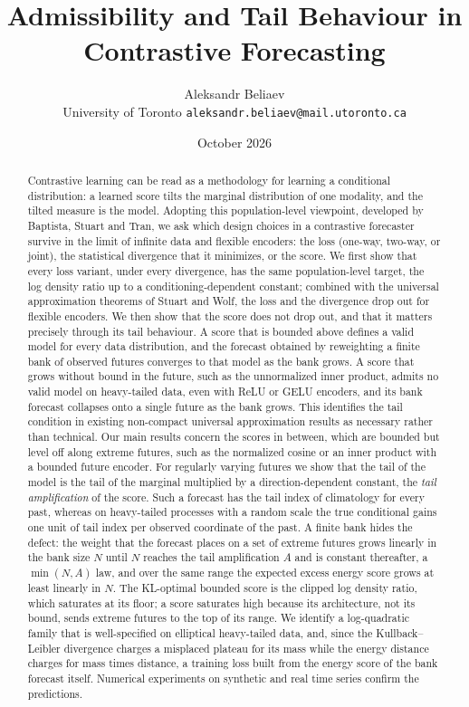 \documentclass[11pt]{article}
\title{Admissibility and Tail Behaviour in Contrastive Forecasting}
\author{Aleksandr Beliaev\\ \small University of Toronto \quad \texttt{aleksandr.beliaev@mail.utoronto.ca}}
\date{October 2026}
\theoremstyle{plain}
\theoremstyle{definition}
\theoremstyle{remark}
\begin{document}
\maketitle

\begin{abstract}
 Contrastive learning can be read as a methodology for learning a conditional
 distribution: a learned score tilts the marginal distribution of one modality,
 and the tilted measure is the model. Adopting this population-level viewpoint,
 developed by Baptista, Stuart and Tran, we ask which design choices in a
 contrastive forecaster survive in the limit of infinite data and flexible
 encoders: the loss (one-way, two-way, or joint), the statistical divergence
 that it minimizes, or the score. We first show that every loss variant, under
 every divergence, has the same population-level target, the log density ratio
 up to a conditioning-dependent constant; combined with the universal
 approximation theorems of Stuart and Wolf, the loss and the divergence drop
 out for flexible encoders. We then show that the score does not drop out, and
 that it matters precisely through its tail behaviour. A score that is bounded
 above defines a valid model for every data distribution, and the forecast
 obtained by reweighting a finite bank of observed futures converges to that
 model as the bank grows. A score that grows without bound in the future,
 such as the unnormalized inner product, admits no valid model on heavy-tailed
 data, even with ReLU or GELU encoders, and its bank forecast collapses onto a
 single future as the bank grows. This identifies the tail condition in existing
 non-compact universal approximation results as necessary rather than
 technical. Our main results concern the scores in between, which are bounded
 but level off along extreme futures, such as the normalized cosine or an
 inner product with a bounded future encoder. For regularly varying futures
 we show that the tail of the model is the tail of the marginal multiplied by
 a direction-dependent constant, the \emph{tail amplification} of the score.
 Such a forecast has the tail index of climatology for every past, whereas on
 heavy-tailed processes with a random scale the true conditional gains one
 unit of tail index per observed coordinate of the past. A finite bank hides
 the defect: the weight that the forecast places on a set of extreme futures
 grows linearly in the bank size $N$ until $N$ reaches the tail amplification
 $A$ and is constant thereafter, a $\min(N,A)$ law, and over the same range
 the expected excess energy score grows at least linearly in $N$. The
 KL-optimal bounded score is the clipped log density ratio, which saturates
 at its floor; a score saturates high because its architecture, not its
 bound, sends extreme futures to the top of its range. We identify a
 log-quadratic family that is well-specified on elliptical heavy-tailed data,
 and, since the Kullback--Leibler divergence charges a misplaced plateau for
 its mass while the energy distance charges for mass times distance, a
 training loss built from the energy score of the bank forecast itself.
 Numerical experiments on synthetic and real time series confirm the
 predictions.
\end{abstract}
\end{document}
